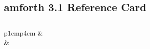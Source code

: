 \documentclass[a4paper,10pt]{article}
\def\colsa{p{1cm}p{4cm}}
\begin{document}
\thispagestyle{empty}
\pagestyle{empty}

\begin{footnotesize}
\section*{\Large amforth 3.1 Reference Card}
\begin{multicols}{3}

\subsection*{}
\begin{tabular}{\colsa}
% 
\verb||  & \verb//\\
              & \verb//\\
\end{tabular}


\end{multicols}
\end{footnotesize}
\end{document}
